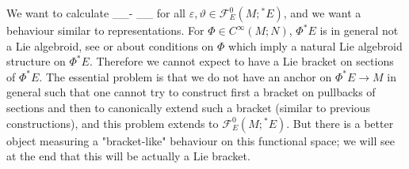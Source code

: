 We want to calculate
\bas
\delta_\vartheta \delta_\varepsilon - \delta_\varepsilon \delta_\vartheta
\eas
for all $\varepsilon, \vartheta \in \mathcal{F}^0_E(M; {}^*E)$, and we want a behaviour similar to representations. For $\Phi \in C^\infty(M;N)$, $\Phi^*E$ is in general not a Lie algebroid, see \cite[\S 3.2ff.]{meinrenkensplitting} or \cite[\S 7.4; page 42ff.]{meinrenkenlie} about conditions on $\Phi$ which imply a natural Lie algebroid structure on $\Phi^*E$. Therefore we cannot expect to have a Lie bracket on sections of $\Phi^*E$. The essential problem is that we do not have an anchor on $\Phi^*E\to M$ in general such that one cannot try to construct first a bracket on pullbacks of sections and then to canonically extend such a bracket (similar to previous constructions), and this problem extends to $\mathcal{F}^0_E(M; {}^*E)$. But there is a better object measuring a "bracket-like" behaviour on this functional space; we will see at the end that this will be actually a Lie bracket.
%

